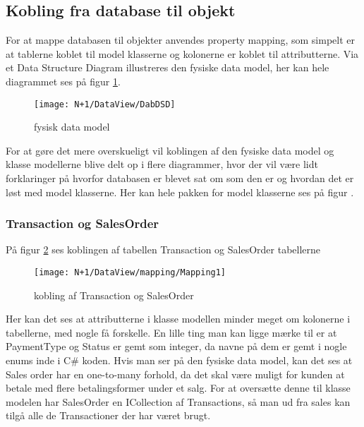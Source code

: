 \subsection{Kobling fra database til objekt}
For at mappe databasen til objekter anvendes property mapping, som simpelt er at tablerne koblet til model klasserne og kolonerne er koblet til attributterne. Via et Data Structure Diagram illustreres den fysiske data model, her kan hele diagrammet ses på figur \ref{fig:DSD}.

\begin{figure}[H]
    \centering
    \texttt{[image: N+1/DataView/DabDSD]}
    \caption{fysisk data model}
    \label{fig:DSD}
\end{figure}

For at gøre det mere overskueligt vil koblingen af den fysiske data model og klasse modellerne blive delt op i flere diagrammer, hvor der vil være lidt forklaringer på hvorfor databasen er blevet sat om som den er og hvordan det er løst med model klasserne. Her kan hele pakken for model klasserne ses på figur .

\subsubsection{Transaction og SalesOrder}
På figur \ref{fig:Mapping_TS} ses koblingen af tabellen Transaction og SalesOrder tabellerne

\begin{figure}[H]
    \centering
    \texttt{[image: N+1/DataView/mapping/Mapping1]}
    \caption{kobling af Transaction og SalesOrder}
    \label{fig:Mapping_TS}
\end{figure}

Her kan det ses at attributterne i klasse modellen minder meget om kolonerne i tabellerne, med nogle få forskelle. En lille ting man kan ligge mærke til er at PaymentType og Status er gemt som integer, da navne på dem er gemt i nogle enums inde i C\# koden. 
\newline\newline
Hvis man ser på den fysiske data model, kan det ses at Sales order har en one-to-many forhold, da det skal være muligt for kunden at betale med flere betalingsformer under et salg. For at oversætte denne til klasse modelen har SalesOrder en ICollection af Transactions, så man ud fra sales kan tilgå alle de Transactioner der har været brugt. 

